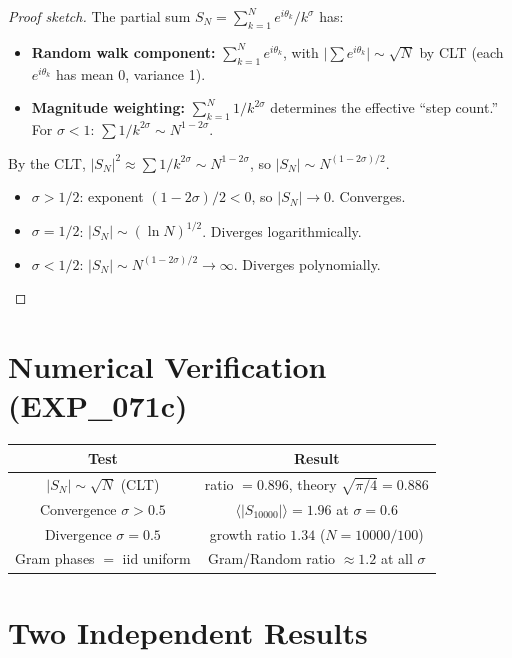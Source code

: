 \documentclass[11pt]{article}
\begin{document}
\begin{proof}[Proof sketch]
The partial sum $S_N = \sum_{k=1}^{N} e^{i\theta_k}/k^\sigma$ has:
\begin{itemize}
  \item \textbf{Random walk component:}
    $\sum_{k=1}^{N} e^{i\theta_k}$, with
    $\bigl|\sum e^{i\theta_k}\bigr| \sim \sqrt{N}$ by CLT
    (each $e^{i\theta_k}$ has mean 0, variance 1).
  \item \textbf{Magnitude weighting:}
    $\sum_{k=1}^{N} 1/k^{2\sigma}$ determines the effective
    ``step count.''  For $\sigma < 1$:
    $\sum 1/k^{2\sigma} \sim N^{1-2\sigma}$.
\end{itemize}
By the CLT, $|S_N|^2 \approx \sum 1/k^{2\sigma} \sim N^{1-2\sigma}$, so
$|S_N| \sim N^{(1-2\sigma)/2}$.
\begin{itemize}
  \item $\sigma > 1/2$: exponent $(1-2\sigma)/2 < 0$, so $|S_N| \to 0$.
    Converges.
  \item $\sigma = 1/2$: $|S_N| \sim (\ln N)^{1/2}$.
    Diverges logarithmically.
  \item $\sigma < 1/2$: $|S_N| \sim N^{(1-2\sigma)/2} \to \infty$.
    Diverges polynomially.
\end{itemize}
\end{proof}

\section{Numerical Verification (EXP\_071c)}

\begin{center}
\renewcommand{\arraystretch}{1.2}
\begin{tabular}{cc}
\hline
\textbf{Test} & \textbf{Result} \\
\hline
$|S_N| \sim \sqrt{N}$ (CLT) &
  ratio $= 0.896$, theory $\sqrt{\pi/4} = 0.886$ \\
Convergence $\sigma > 0.5$ &
  $\langle|S_{10000}|\rangle = 1.96$ at $\sigma = 0.6$ \\
Divergence $\sigma = 0.5$ &
  growth ratio $1.34$ ($N = 10000/100$) \\
Gram phases $=$ iid uniform &
  Gram/Random ratio $\approx 1.2$ at all $\sigma$ \\
\hline
\end{tabular}
\end{center}

\section{Two Independent Results}
\end{document}
